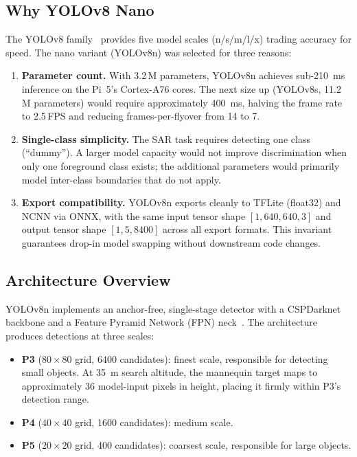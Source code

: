 \documentclass[10pt,a4paper]{article}
\begin{document}
\subsection{Why YOLOv8 Nano}

The YOLOv8 family~\cite{yolov8} provides five model scales (n/s/m/l/x) trading accuracy for speed. The nano variant (YOLOv8n) was selected for three reasons:

\begin{enumerate}
    \item \textbf{Parameter count.} With 3.2\,M parameters, YOLOv8n achieves sub-\SI{210}{\milli\second} inference on the Pi~5's Cortex-A76 cores. The next size up (YOLOv8s, 11.2\,M parameters) would require approximately \SI{400}{\milli\second}, halving the frame rate to 2.5\,FPS and reducing frames-per-flyover from 14 to 7.
    \item \textbf{Single-class simplicity.} The SAR task requires detecting one class (``dummy''). A larger model capacity would not improve discrimination when only one foreground class exists; the additional parameters would primarily model inter-class boundaries that do not apply.
    \item \textbf{Export compatibility.} YOLOv8n exports cleanly to TFLite (float32) and NCNN via ONNX, with the same input tensor shape $[1, 640, 640, 3]$ and output tensor shape $[1, 5, 8400]$ across all export formats. This invariant guarantees drop-in model swapping without downstream code changes.
\end{enumerate}

\subsection{Architecture Overview}

YOLOv8n implements an anchor-free, single-stage detector with a CSPDarknet backbone and a Feature Pyramid Network (FPN) neck~\cite{yolov8}. The architecture produces detections at three scales:

\begin{itemize}
    \item \textbf{P3} ($80 \times 80$ grid, 6400 candidates): finest scale, responsible for detecting small objects. At \SI{35}{\metre} search altitude, the mannequin target maps to approximately 36 model-input pixels in height, placing it firmly within P3's detection range.
    \item \textbf{P4} ($40 \times 40$ grid, 1600 candidates): medium scale.
    \item \textbf{P5} ($20 \times 20$ grid, 400 candidates): coarsest scale, responsible for large objects.
\end{itemize}
\end{document}
